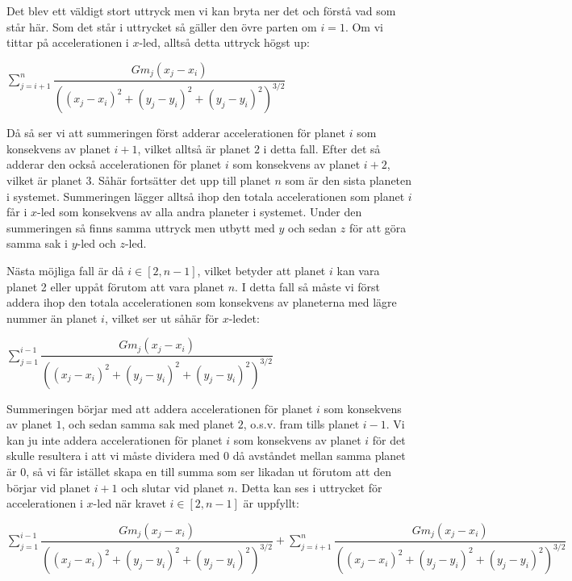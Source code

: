 \documentclass[10pt, a4paper]{amsart}
\begin{document}
Det blev ett väldigt stort uttryck men vi kan bryta ner det och förstå vad som står här. 
Som det står i uttrycket så gäller den övre parten om $ i = 1 $. 
Om vi tittar på accelerationen i $ x $-led, alltså detta uttryck högst up:
\bigskip

\bigskip
\hspace{5ex}
$ \sum\limits_{j=i + 1}^{n} \dfrac{Gm_j(x_j - x_i)}{((x_j - x_i)^2+(y_j - y_i)^2+(y_j - y_i)^2)^{3/2}} $
\bigskip
\bigskip

Då så ser vi att summeringen först adderar accelerationen för planet $ i $ som konsekvens av planet $ i + 1 $, 
vilket alltså är planet $ 2 $ i detta fall.
Efter det så adderar den också accelerationen för planet $ i $ som konsekvens av planet $ i + 2 $,
vilket är planet $ 3 $.
Såhär fortsätter det upp till planet $ n $ som är den sista planeten i systemet. 
Summeringen lägger alltså ihop den totala accelerationen som planet $ i $ får i $ x $-led som konsekvens av alla andra planeter i systemet.
Under den summeringen så finns samma uttryck men utbytt med $ y $ och sedan $ z $ för att göra samma sak i $ y $-led och $ z $-led.
\bigskip

Nästa möjliga fall är då $ i \in \left[2, n - 1\right] $, vilket betyder att planet $ i $ kan vara planet 2 eller uppåt förutom att vara planet $ n $.
I detta fall så måste vi först addera ihop den totala accelerationen som konsekvens av planeterna med lägre nummer än planet $ i $, 
vilket ser ut såhär för $ x $-ledet:
\bigskip

\bigskip
\hspace{5ex}
$ \sum\limits_{j=1}^{i - 1} \dfrac{Gm_j(x_j - x_i)}{((x_j - x_i)^2+(y_j - y_i)^2+(y_j - y_i)^2)^{3/2}} $
\bigskip
\bigskip

Summeringen börjar med att addera accelerationen för planet $ i $ som konsekvens av planet $ 1 $, 
och sedan samma sak med planet $ 2 $, o.s.v. fram tills planet $ i - 1 $.
Vi kan ju inte addera accelerationen för planet $ i $ som konsekvens av planet $ i $ för det skulle resultera i att vi måste dividera med $ 0 $ då avståndet mellan samma planet är $ 0 $,
så vi får istället skapa en till summa som ser likadan ut förutom att den börjar vid planet $ i + 1 $ och slutar vid planet $ n $. 
Detta kan ses i uttrycket för accelerationen i $ x $-led när kravet $ i \in \left[2, n - 1\right] $ är uppfyllt:
\bigskip

\bigskip
\hspace{5ex}
$ \sum\limits_{j=1}^{i - 1} \dfrac{Gm_j(x_j - x_i)}{((x_j - x_i)^2+(y_j - y_i)^2+(y_j - y_i)^2)^{3/2}} + \sum\limits_{j=i + 1}^{n} \dfrac{Gm_j(x_j - x_i)}{((x_j - x_i)^2+(y_j - y_i)^2+(y_j - y_i)^2)^{3/2}} $
\bigskip
\bigskip
\end{document}
